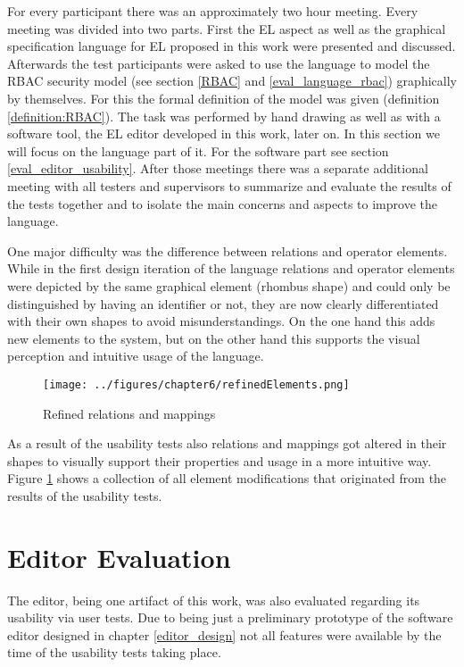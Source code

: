 \documentclass[twoside, openright, 12pt]{book}
\begin{document}
For every participant there was an approximately two hour meeting.
Every meeting was divided into two parts.
First the EL aspect as well as the graphical specification language for EL proposed in this work were presented and discussed.
Afterwards the test participants were asked to use the language to model the RBAC security model (see section \ref{RBAC} and \ref{eval_language_rbac}) graphically by themselves.
For this the formal definition of the model was given (definition \ref{definition:RBAC}).
The task was performed by hand drawing as well as with a software tool, the EL editor developed in this work, later on.
In this section we will focus on the language part of it.
For the software part see section \ref{eval_editor_usability}.
After those meetings there was a separate additional meeting with all testers and supervisors to summarize and evaluate the results of the tests together and to isolate the main concerns and aspects to improve the language.

One major difficulty was the difference between relations and operator elements.
While in the first design iteration of the language relations and operator elements were depicted by the same graphical element (rhombus shape) and could only be distinguished by having an identifier or not, they are now clearly differentiated with their own shapes to avoid misunderstandings.
On the one hand this adds new elements to the system, but on the other hand this supports the visual perception and intuitive usage of the language.

\begin{figure}[htb]
	\centering
	\texttt{[image: ../figures/chapter6/refinedElements.png]}
	\caption{Refined relations and mappings}
	\label{fig:refinedElements}
\end{figure}

As a result of the usability tests also relations and mappings got altered in their shapes to visually support their properties and usage in a more intuitive way.
Figure \ref{fig:refinedElements} shows a collection of all element modifications that originated from the results of the usability tests.



\section{Editor Evaluation}
\label{eval_editor}
The editor, being one artifact of this work, was also evaluated regarding its usability via user tests.
Due to being just a preliminary prototype of the software editor designed in chapter \ref{editor_design} not all features were available by the time of the usability tests taking place.
\end{document}
